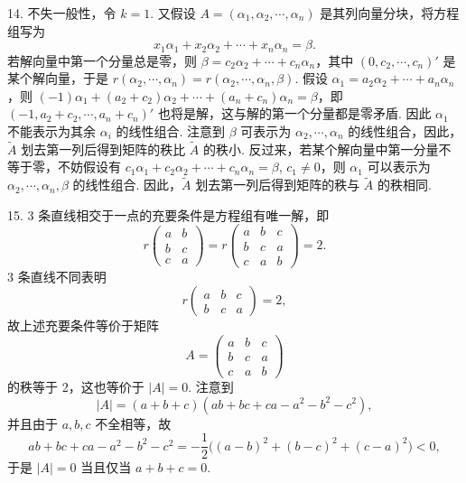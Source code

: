 \documentclass[UTF8, 12pt, fontset=fandol, oneside]{ctexart}
\begin{document}
14. 不失一般性，令 $k=1$. 又假设 $A=(\alpha_1,\alpha_2,\cdots,\alpha_n)$ 是其列向量分块，将方程组写为
\[
x_1\alpha_1+x_2\alpha_2+\cdots+x_n\alpha_n=\beta.
\]
若解向量中第一个分量总是零，则 $\beta=c_2\alpha_2+\cdots+c_n\alpha_n$，其中 $(0,c_2,\cdots,c_n)'$ 是某个解向量，于是 $r(\alpha_2,\cdots,\alpha_n)=r(\alpha_2,\cdots,\alpha_n,\beta)$. 假设 $\alpha_1=a_2\alpha_2+\cdots+a_n\alpha_n$，则 $(-1)\alpha_1+(a_2+c_2)\alpha_2+\cdots+(a_n+c_n)\alpha_n=\beta$，即 $(-1,a_2+c_2,\cdots,a_n+c_n)'$ 也将是解，这与解的第一个分量都是零矛盾. 因此 $\alpha_1$ 不能表示为其余 $\alpha_i$ 的线性组合. 注意到 $\beta$ 可表示为 $\alpha_2,\cdots,\alpha_n$ 的线性组合，因此，$\widetilde{A}$ 划去第一列后得到矩阵的秩比 $\widetilde{A}$ 的秩小. 反过来，若某个解向量中第一分量不等于零，不妨假设有 $c_1\alpha_1+c_2\alpha_2+\cdots+c_n\alpha_n=\beta$, $c_1\ne 0$，则 $\alpha_1$ 可以表示为 $\alpha_2,\cdots,\alpha_n,\beta$ 的线性组合. 因此，$\widetilde{A}$ 划去第一列后得到矩阵的秩与 $\widetilde{A}$ 的秩相同.

15. 3 条直线相交于一点的充要条件是方程组有唯一解，即
\[
r\begin{pmatrix}
a&b\\
b&c\\
c&a
\end{pmatrix}
=
r\begin{pmatrix}
a&b&c\\
b&c&a\\
c&a&b
\end{pmatrix}
=2.
\]
3 条直线不同表明
\[
r\begin{pmatrix}
a&b&c\\
b&c&a
\end{pmatrix}=2,
\]
故上述充要条件等价于矩阵
\[
A=\begin{pmatrix}
a&b&c\\
b&c&a\\
c&a&b
\end{pmatrix}
\]
的秩等于 2，这也等价于 $|A|=0$. 注意到
\[
|A|=(a+b+c)(ab+bc+ca-a^2-b^2-c^2),
\]
并且由于 $a,b,c$ 不全相等，故
\[
ab+bc+ca-a^2-b^2-c^2=-\frac12\bigl((a-b)^2+(b-c)^2+(c-a)^2\bigr)<0,
\]
于是 $|A|=0$ 当且仅当 $a+b+c=0$.
\end{document}
